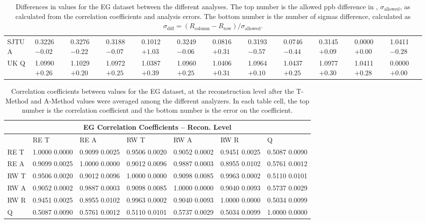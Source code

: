 \begin{landscape}
\begin{table}
\begin{tabularx}{1\linewidth}{@{\extracolsep{\fill}}lXXXXXXXXXXX}
	SJTU A & 0.3226 $-0.02$ & 0.3276 $-0.22$ & 0.3188 $-0.07$ & 0.1012 $+1.03$ & 0.3249 $-0.06$ & 0.0816 $+0.31$ & 0.3193 $-0.57$ & 0.0746 $-0.44$ & 0.3145 $+0.09$ & 0.0000 $+0.00$ & 1.0411 $-0.28$  \\
	UK Q   & 1.0990 $+0.26$ & 1.1029 $+0.20$ & 1.0972 $+0.25$ & 1.0387 $+0.39$ & 1.0960 $+0.25$ & 1.0406 $+0.31$ & 1.0964 $+0.10$ & 1.0437 $+0.25$ & 1.0977 $+0.30$ & 1.0411 $+0.28$ & 0.0000 $+0.00$  \\
  \bottomrule
\end{tabularx}
\caption[]{Differences in \R values for the EG dataset between the different analyses. The top number is the allowed ppb difference in \R, $\sigma_{\text{allowed}}$, as calculated from the correlation coefficients and analysis errors. The bottom number is the number of sigmas difference, calculated as $\sigma_{\text{diff}} = (R_{\text{column}}-R_{\text{row}})/\sigma_{\text{allowed}}$.}
\label{tab:EG_diff}
\end{table}
\end{landscape}


\begin{table}
\setlength\tabcolsep{15pt}
\small
\centering
\renewcommand{\arraystretch}{1.4}
\begin{tabularx}{0.8\linewidth}{@{\extracolsep{\fill}}lXXXXXX}
  \toprule
  	\multicolumn{7}{c}{{\normalsize EG Correlation Coefficients -- Recon. Level}} \\
  \midrule
  	       & RE T & RE A & RW T & RW A & RW R & \quad Q \\
  \midrule
	RE T   & 1.0000 0.0000 & 0.9099 0.0025 & 0.9506 0.0020 & 0.9052 0.0002 & 0.9451 0.0025 & 0.5087 0.0090  \\
	RE A   & 0.9099 0.0025 & 1.0000 0.0000 & 0.9012 0.0096 & 0.9887 0.0003 & 0.8955 0.0102 & 0.5761 0.0012  \\
	RW T   & 0.9506 0.0020 & 0.9012 0.0096 & 1.0000 0.0000 & 0.9098 0.0085 & 0.9963 0.0002 & 0.5110 0.0101  \\
	RW A   & 0.9052 0.0002 & 0.9887 0.0003 & 0.9098 0.0085 & 1.0000 0.0000 & 0.9040 0.0093 & 0.5737 0.0029  \\
	RW R   & 0.9451 0.0025 & 0.8955 0.0102 & 0.9963 0.0002 & 0.9040 0.0093 & 1.0000 0.0000 & 0.5034 0.0099  \\
	Q      & 0.5087 0.0090 & 0.5761 0.0012 & 0.5110 0.0101 & 0.5737 0.0029 & 0.5034 0.0099 & 1.0000 0.0000  \\
  \bottomrule
\end{tabularx}
\caption[]{Correlation coefficients between \R values for the EG dataset, at the reconstruction level after the \RW T-Method and A-Method \R values were averaged among the different analyzers. In each table cell, the top number is the correlation coefficient and the bottom number is the error on the coefficient.}
\label{tab:Corrs_EG_recon}
\end{table}






